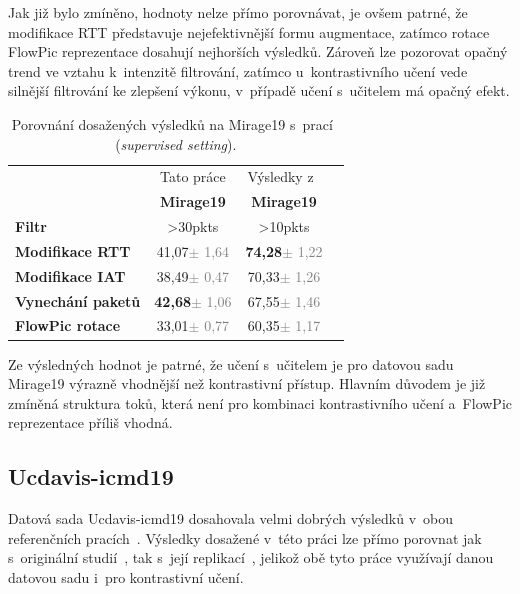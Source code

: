 Jak již bylo zmíněno, hodnoty nelze přímo porovnávat, je ovšem patrné, že modifikace RTT představuje nejefektivnější formu augmentace, zatímco rotace FlowPic reprezentace dosahují nejhorších výsledků. Zároveň lze pozorovat opačný trend ve vztahu k~intenzitě filtrování, zatímco u~kontrastivního učení vede silnější filtrování ke zlepšení výkonu, v~případě učení s~učitelem má opačný efekt.

\begin{table}[H]
    \centering
    \begin{tabular}{lccc}
        \toprule
         & Tato práce & Výsledky z~\cite{huawei_paper}\\
          & \textbf{Mirage19} & \textbf{Mirage19} \\
         \textbf{Filtr} & >30pkts & >10pkts \\
        \midrule
        \textbf{Modifikace RTT} & 41,07{\tiny\textcolor{gray}{$\pm$ 1,64}} & \textbf{74,28}{\tiny\textcolor{gray}{$\pm$ 1,22}} \\
        \textbf{Modifikace IAT} & 38,49{\tiny\textcolor{gray}{$\pm$ 0,47}} & 70,33{\tiny\textcolor{gray}{$\pm$ 1,26}} \\
        \textbf{Vynechání paketů} & \textbf{42,68}{\tiny\textcolor{gray}{$\pm$ 1,06}} & 67,55{\tiny\textcolor{gray}{$\pm$ 1,46}} \\
        \textbf{FlowPic rotace} & 33,01{\tiny\textcolor{gray}{$\pm$ 0,77}} & 60,35{\tiny\textcolor{gray}{$\pm$ 1,17}} \\
        \bottomrule
    \end{tabular}
    \caption{Porovnání dosažených výsledků na Mirage19 s~prací~\cite{huawei_paper} (\textit{supervised setting}).}
\end{table}

Ze výsledných hodnot je patrné, že učení s~učitelem je pro datovou sadu Mirage19 výrazně vhodnější než kontrastivní přístup. Hlavním důvodem je již zmíněná struktura toků, která není pro kombinaci kontrastivního učení a~FlowPic reprezentace příliš vhodná.

\subsection{Ucdavis-icmd19}
\label{ucdavis_results}
Datová sada Ucdavis-icmd19 dosahovala velmi dobrých výsledků v~obou referenčních pracích~\cite{flowpic_augmentations, huawei_paper}. Výsledky dosažené v~této práci lze přímo porovnat jak s~originální studií~\cite{flowpic_augmentations}, tak s~její replikací~\cite{huawei_paper}, jelikož obě tyto práce využívají danou datovou sadu i~pro kontrastivní učení.

